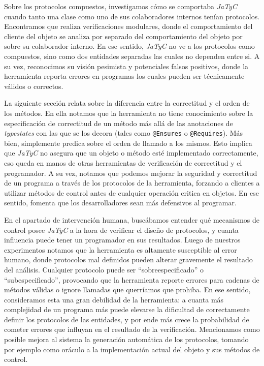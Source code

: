 Sobre los protocolos compuestos, investigamos cómo se comportaba \textit{JaTyC} cuando tanto una clase como uno de sus colaboradores internos tenían protocolos. Encontramos que realiza verificaciones modulares, donde el comportamiento del cliente del objeto se analiza por separado del comportamiento del objeto por sobre su colaborador interno. En ese sentido, \textit{JaTyC} no ve a los protocolos como compuestos, sino como dos entidades separadas las cuales no dependen entre si. A su vez, reconocimos su visión pesimista y potenciales falsos positivos, donde la herramienta reporta errores en programas los cuales pueden ser técnicamente válidos o correctos.

La siguiente sección relata sobre la diferencia entre la correctitud y el orden de los métodos. En ella notamos que la herramienta no tiene conocimiento sobre la especificación de correctitud de un método más allá de las anotaciones de \textit{typestates} con las que se los decora (tales como \texttt{@Ensures} o \texttt{@Requires}). Más bien, simplemente predica sobre el orden de llamado a los mismos. Esto implica que \textit{JaTyC} no asegura que un objeto o método esté implementado correctamente, eso queda en manos de otras herramientas de verificación de correctitud y el programador. A su vez, notamos que podemos mejorar la seguridad y correctitud de un programa a través de los protocolos de la herramienta, forzando a clientes a utilizar métodos de control antes de cualquier operación critica en objetos. En ese sentido, fomenta que los desarrolladores sean más defensivos al programar.

En el apartado de intervención humana, buscábamos entender qué mecanismos de control posee \textit{JaTyC} a la hora de verificar el diseño de protocolos, y cuanta influencia puede tener un programador en sus resultados. Luego de nuestros experimentos notamos que la herramienta es altamente susceptible al error humano, donde protocolos mal definidos pueden alterar gravemente el resultado del análisis. Cualquier protocolo puede ser ``sobreespecificado'' o ``subespecificado'', provocando que la herramienta reporte errores para cadenas de métodos válidas o ignore llamadas que querríamos que prohiba. En ese sentido, consideramos esta una gran debilidad de la herramienta: a cuanta más complejidad de un programa más puede elevarse la dificultad de correctamente definir los protocolos de las entidades, y por ende más crece la probabilidad de cometer errores que influyan en el resultado de la verificación. Mencionamos como posible mejora al sistema la generación automática de los protocolos, tomando por ejemplo como oráculo a la implementación actual del objeto y sus métodos de control.

